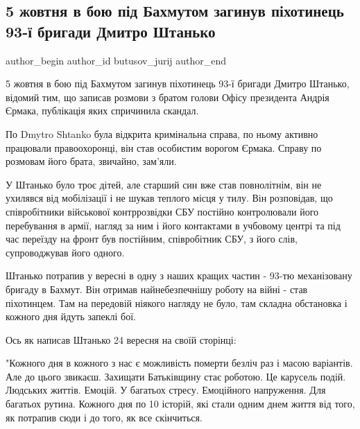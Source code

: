  
 
 
 
 
 
\subsection{5 жовтня в бою під Бахмутом загинув піхотинець 93-ї бригади Дмитро Штанько}
\label{sec:12_10_2022.fb.butusov_jurij.1.shtanko}
 
\ifcmt
 author_begin
   author_id butusov_jurij
 author_end
\fi


5 жовтня в бою під Бахмутом загинув піхотинець 93-ї бригади Дмитро Штанько,
відомий тим, що записав розмови з братом голови Офісу президента Андрія Єрмака,
публікація яких спричинила скандал.

По Dmytro Shtanko була відкрита кримінальна справа, по ньому активно працювали
правоохоронці, він став особистим ворогом Єрмака. Справу по розмовам його
брата, звичайно, зам'яли.

У Штанько було троє дітей, але старший син вже став повнолітнім, він не
ухилявся від мобілізації і не шукав теплого місця у тилу. Він розповідав, що
співробітники військової контррозвідки СБУ постійно контролювали його
перебування в армії, нагляд за ним і його контактами в учбовому центрі та під
час переїзду на фронт був постійним, співробітник СБУ, з його слів,
супроводжував його одного.

Штанько потрапив у вересні в одну з наших кращих частин - 93-тю механізовану
бригаду в Бахмут. Він отримав найнебезпечнішу роботу на війні - став
піхотинцем. Там на передовій ніякого нагляду не було, там складна обстановка і
кожного дня йдуть запеклі бої.

Ось як написав Штанько 24 вересня на своїй сторінці:

"Кожного дня в кожного з нас є можливість померти безліч раз і масою варіантів.
Але до цього звикаєш. Захищати Батьківщину стає роботою.  Це карусель подій.
Людських життів. Емоцій. У багатьох стресу. Емоційного напруження. Для багатьох
рутина. Кожного дня по 10 історій, які стали одним днем життя від того, як
потрапив сюди і до того, як все скінчиться.

